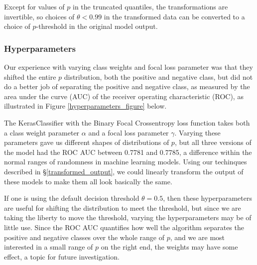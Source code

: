 %

\FloatBarrier

Except for values of $p$ in the truncated quantiles, the transformations are invertible, so choices of $\theta < 0.99$ in the transformed data can be converted to a choice of $p$-threshold in the original model output.  


\subsubsection{Hyperparameters}
\label{hyperparameters}

Our experience with varying class weights and focal loss parameter was that they shifted the entire $p$ distribution, both the positive and negative class, but did not do a better job of separating the positive and negative class, as measured by the area under the curve (AUC) of the receiver operating characteristic (ROC), as illustrated in Figure \ref{hyperparameters_figure} below. 

The KerasClassifier with the Binary Focal Crossentropy loss function takes both a class weight parameter $\alpha$ and a focal loss parameter $\gamma$.  Varying these parameters gave us different shapes of distributions of $p$, but all three versions of the model had the ROC AUC between 0.7781 and 0.7785, a difference within the normal ranges of randomness in machine learning models.  Using our techinques described in \S\ref{transformed_output}, we could linearly transform the output of these models to make them all look basically the same.  

If one is using the default decision threshold $\theta = 0.5$, then these hyperparameters are useful for shifting the distribution to meet the threshold, but since we are taking the liberty to move the threshold, varying the hyperparameters may be of little use.  Since the ROC AUC quantifies how well the algorithm separates the positive and negative classes over the whole range of $p$, and we are most interested in a small range of $p$ on the right end, the weights may have some effect, a topic for future investigation.  

\


